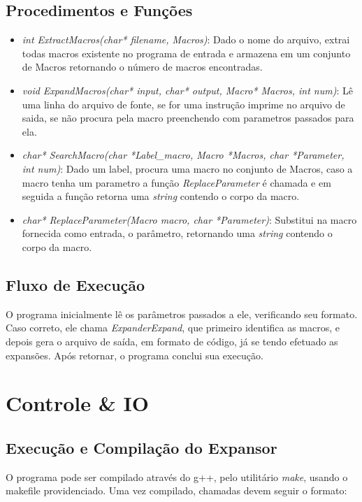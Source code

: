 \documentclass[12pt, a4paper]{article}
\begin{document}
\subsection{Procedimentos e Funções}
\begin{itemize}
	\item \emph{int ExtractMacros(char* filename, Macros)}: Dado o nome do arquivo, extrai todas macros existente no programa de entrada e armazena em um conjunto de Macros retornando o número de macros encontradas. 
	\item \emph{void ExpandMacros(char* input, char* output, Macro* Macros, int num)}: Lê uma linha do arquivo de fonte, se for uma instrução imprime no arquivo de saida, se não procura pela macro preenchendo com parametros passados para ela.	
	\item \emph{char* SearchMacro(char *Label\_macro, Macro *Macros, char *Parameter, int num)}: Dado um label, procura uma macro no conjunto de Macros, caso a macro tenha um parametro a função \emph{ReplaceParameter} é chamada e em seguida a função retorna uma \emph{string} contendo o corpo da macro.
	\item \emph{char* ReplaceParameter(Macro macro, char *Parameter)}: Substitui na macro fornecida como entrada, o parâmetro, retornando uma \emph{string} contendo o corpo da macro.
\end{itemize}

\subsection{Fluxo de Execução}

O programa inicialmente lê os parâmetros passados a ele, verificando seu formato. Caso correto, ele chama \emph{ExpanderExpand}, que primeiro identifica as macros, e depois gera o arquivo de saída, em formato de código, já se tendo efetuado as expansões. Após retornar, o programa conclui sua execução.

\section{Controle \& IO}

\subsection{Execução e Compilação do Expansor}

O programa pode ser compilado através do g++, pelo utilitário \emph{make}, usando o makefile providenciado. Uma vez compilado, chamadas devem seguir o formato:
\end{document}
